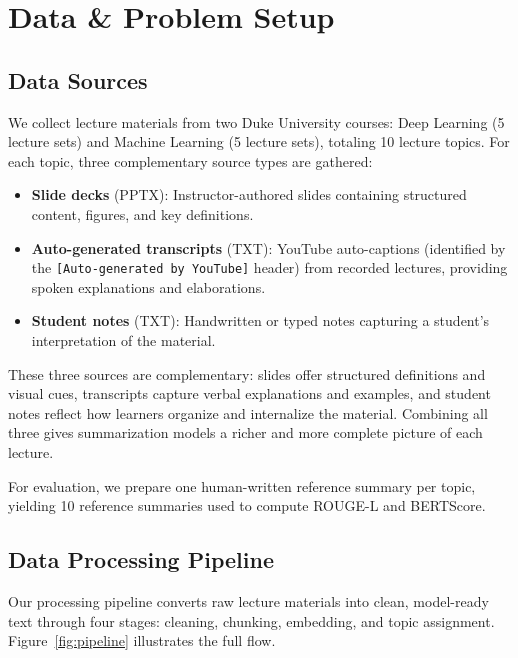 \section{Data \& Problem Setup}
\label{sec:data}

\subsection{Data Sources}

We collect lecture materials from two Duke University courses: Deep Learning (5 lecture sets) and Machine Learning (5 lecture sets), totaling 10 lecture topics. For each topic, three complementary source types are gathered:

\begin{itemize}
    \item \textbf{Slide decks} (PPTX): Instructor-authored slides containing structured content, figures, and key definitions.
    \item \textbf{Auto-generated transcripts} (TXT): YouTube auto-captions (identified by the \texttt{[Auto-generated by YouTube]} header) from recorded lectures, providing spoken explanations and elaborations.
    \item \textbf{Student notes} (TXT): Handwritten or typed notes capturing a student's interpretation of the material.
\end{itemize}

These three sources are complementary: slides offer structured definitions and visual cues, transcripts capture verbal explanations and examples, and student notes reflect how learners organize and internalize the material. Combining all three gives summarization models a richer and more complete picture of each lecture.

For evaluation, we prepare one human-written reference summary per topic, yielding 10 reference summaries used to compute ROUGE-L and BERTScore.

\subsection{Data Processing Pipeline}
\label{sec:pipeline}

Our processing pipeline converts raw lecture materials into clean, model-ready text through four stages: cleaning, chunking, embedding, and topic assignment. Figure~\ref{fig:pipeline} illustrates the full flow.

